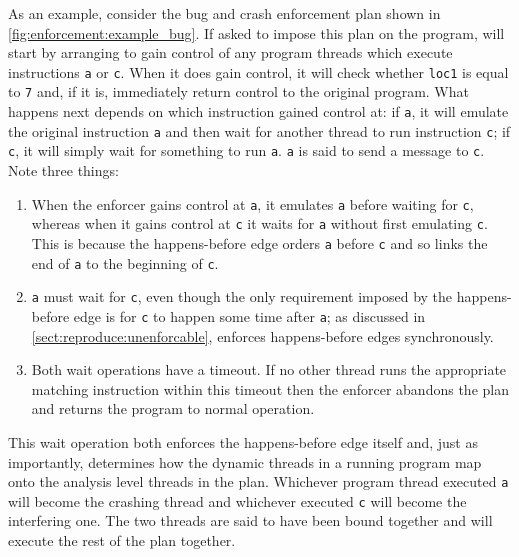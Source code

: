 As an example, consider the bug and crash enforcement plan shown in
\autoref{fig:enforcement:example_bug}.  If asked to impose this plan
on the program, {\technique} will start by arranging to gain control
of any program threads which execute instructions {\tt a} or {\tt c}.
When it does gain control, it will check whether \texttt{loc1} is
equal to \texttt{7} and, if it is, immediately return control to the
original program.  What happens next depends on which instruction
{\technique} gained control at: if {\tt a}, it will emulate the
original instruction {\tt a} and then wait for another thread to run
instruction {\tt c}; if {\tt c}, it will simply wait for something to
run {\tt a}.  \texttt{a} is said to send a message to \texttt{c}.
Note three things:
\begin{enumerate}
\item When the enforcer gains control at {\tt a}, it emulates {\tt a}
  before waiting for {\tt c}, whereas when it gains control at {\tt c}
  it waits for {\tt a} without first emulating {\tt c}.  This is
  because the happens-before edge orders {\tt a} before {\tt c} and so
  links the end of {\tt a} to the beginning of {\tt c}.
\item {\tt a} must wait for {\tt c}, even though the only requirement
  imposed by the happens-before edge is for {\tt c} to happen some
  time after {\tt a}; as discussed in
  \autoref{sect:reproduce:unenforcable}, {\technique} enforces
  happens-before edges synchronously.
\item Both wait operations have a timeout.  If no other thread runs
  the appropriate matching instruction within this timeout then the
  enforcer abandons the plan and returns the program to normal
  operation.
\end{enumerate}
This wait operation both enforces the happens-before edge itself and,
just as importantly, determines how the dynamic threads in a running
program map onto the analysis level threads in the plan.  Whichever
program thread executed {\tt a} will become the crashing thread and
whichever executed {\tt c} will become the interfering one.  The two
threads are said to have been bound together and will execute the rest
of the plan together.

